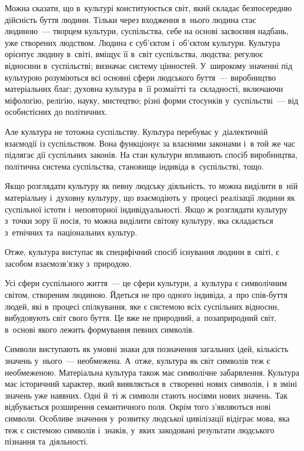\documentclass[a5paper,oneside,DIV=12,12pt,headings=small]{scrartcl}
\begin{document}
		Можна сказати, що в~культурі конституюється світ, який складає безпосередню дійсність буття людини. Тільки через входження в~нього людина стає людиною~— творцем культури, суспільства, себе на основі засвоєння надбань, уже створених людством. Людина є суб'\-єктом і~об'\-єктом культури. Культура орієнтує людину в~світі, вміщує  її в~світ суспільства, людства; регулює відносини в~суспільстві; визначає  систему цінностей. У~широкому значенні під культурою розуміються всі основні сфери людського буття~— виробництво матеріальних благ;  духовна культура в~її розмаїтті та~складності,  включаючи  міфологію, релігію, науку, мистецтво; різні форми стосунків у~суспільстві~— від особистісних до політичних.
		
		Але культура не тотожна суспільству. Культура перебуває у~діалектичній взаємодії із суспільством. Вона функціонує за власними законами і~в той же час підлягає дії суспільних законів. На стан культури впливають спосіб виробництва, політична система суспільства, становище індивіда в~суспільстві, тощо.
		
		Якщо розглядати культуру як певну людську діяльність, то можна виділити в~ній матеріальну і~духовну культуру, що взаємодіють у~процесі реалізації людини як суспільної істоти і~неповторної індивідуальності. Якщо ж розглядати культуру з~точки зору її носія, то можна виділити світову культуру, яка складається з~етнічних та~національних культур. 
		
		Отже, культура  виступає як специфічний спосіб існування людини в~світі, є засобом взаємозв'язку з~природою. 
		
		Усі сфери суспільного життя~— це сфери культури, а~культура є символічним світом, створеним людиною. Йдеться не про одного індивіда, а~про спів-буття людей, які в~процесі спілкування, яке є системою всіх  суспільних відносин, вибудовують світ свого буття. Це вже не природний, а~позаприродний світ, в~основі якого лежить формування певних символів.
		
		Символи виступають як умовні знаки для позначення загальних ідей, кількість значень у~нього~— необмежена. А~отже, культура як світ символів теж є необмеженою. Матеріальна культура також має символічне забарвлення. Культура має історичний характер, який виявляється в~створенні нових символів, і~в зміні значень уже наявних. Одні й~ті ж символи стають носіями нових значень. Так відбувається розширення семантичного поля. Окрім того з'являються нові символи. Особливе значення у~розвитку людської цивілізації відіграє мова, яка теж є системою символів і~знаків, у~яких закодовані результати людського пізнання та~діяльності.
\end{document}
